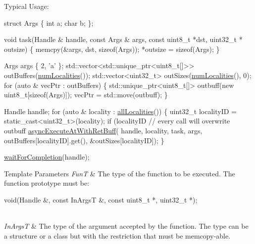 Typical Usage\-: 
\begin{DoxyCode}
\textcolor{keyword}{struct }Args \{
  \textcolor{keywordtype}{int} a;
  \textcolor{keywordtype}{char} b;
\};

\textcolor{keywordtype}{void} task(Handle & handle, \textcolor{keyword}{const} Args & args,
          \textcolor{keyword}{const} uint8\_t *dst, uint32\_t * outsize) \{
  memcpy(&args, dst, \textcolor{keyword}{sizeof}(Args));
  *outsize = \textcolor{keyword}{sizeof}(Args);
\}

Args args \{ 2, \textcolor{charliteral}{'a'} \};
std::vector<std::unique\_ptr<uint8\_t[]>> outBuffers(\hyperlink{namespaceshad_1_1rt_a199bb50c21e9012f615520413872aef6}{numLocalities}());
std::vector<uint32\_t> outSizes(\hyperlink{namespaceshad_1_1rt_a199bb50c21e9012f615520413872aef6}{numLocalities}(), 0);
\textcolor{keywordflow}{for} (\textcolor{keyword}{auto} & vecPtr : outBuffers) \{
  std::unique\_ptr<uint8\_t[]> outbuff(\textcolor{keyword}{new} uint8\_t[\textcolor{keyword}{sizeof}(Args)]);
  vecPtr = std::move(outbuff);
\}

Handle handle;
\textcolor{keywordflow}{for} (\textcolor{keyword}{auto} & locality : \hyperlink{namespaceshad_1_1rt_adea42bceb84b2161df8fece9d20cb7cf}{allLocalities}()) \{
  uint32\_t localityID = \textcolor{keyword}{static\_cast<}uint32\_t\textcolor{keyword}{>}(locality);
  \textcolor{keywordflow}{if} (localityID %
    \textcolor{comment}{// every call will overwrite outbuff}
    \hyperlink{namespaceshad_1_1rt_a7021749e6a86c90e762645385e22ac5c}{asyncExecuteAtWithRetBuff}(
      handle, locality, task, args, outBuffers[localityID].\textcolor{keyword}{get}(),
      &outSizes[localityID]);
\}

\hyperlink{namespaceshad_1_1rt_a6ea1d3672bac3a80032863b6732a0c0a}{waitForCompletion}(handle);
\end{DoxyCode}



\begin{DoxyTemplParams}{Template Parameters}
{\em Fun\-T} & The type of the function to be executed. The function prototype must be\-: 
\begin{DoxyCode}
void(Handle &, \textcolor{keyword}{const} InArgsT &, \textcolor{keyword}{const} uint8\_t *, uint32\_t *);
\end{DoxyCode}
\\
\hline
{\em In\-Args\-T} & The type of the argument accepted by the function. The type can be a structure or a class but with the restriction that must be memcopy-\/able.\\
\hline
\end{DoxyTemplParams}

